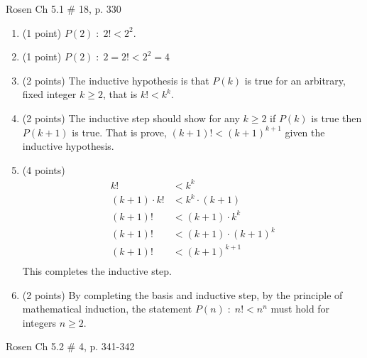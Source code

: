 \documentclass[12pt,addpoints]{exam}
\begin{document}
\begin{questions}
\question[12] Rosen Ch 5.1 \# 18, p. 330
    \ifprintanswers
        \vspace{-10pt}
   \fi
\begin{solution}
\begin{enumerate}[label=(\alph*), itemsep=0pt, topsep=0pt, parsep=0pt]
    \item (1 point) $P(2) \;:\;  2! < 2^2$.
    \item (1 point) $P(2) \;:\; 2 = 2! < 2^2 = 4$
    \item (2 points) The inductive hypothesis is that $P(k)$ is true for an arbitrary, fixed integer $k \geq 2$, that is $k! < k^k.$
    \item (2 points) The inductive step should show for any $k \geq 2$ if $P(k)$ is true then $P(k+1)$ is true. That is prove, $(k+1)! < (k+1)^{k+1}$ given the inductive hypothesis.
    \item (4 points)
    \begin{align*}
        k! &< k^k \tag{mult. both sides by (k+1)} \\
        (k+1)\cdot k! &< k^k \cdot (k+1) \\
        (k+1)! &< (k+1)\cdot k^k \\
        (k+1)! &< (k+1)\cdot (k+1)^k  \tag{ $k < k+1$ } \\
        (k+1)! &< (k+1)^{k+1} \\
    \end{align*}
    This completes the inductive step.
    \item (2 points) By completing the basis and inductive step, by the principle of mathematical induction, the statement $P(n) \;:\; n! < n^n$ must hold for integers $n \geq 2$.
\end{enumerate}
\end{solution}



\question[10] Rosen Ch 5.2 \# 4, p. 341-342
    \ifprintanswers
        \vspace{-10pt}
   \fi
\begin{solution}
\end{solution}
\end{questions}
\end{document}
